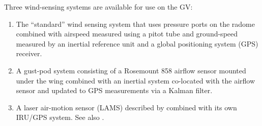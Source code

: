 \documentclass[12pt,twoside,english]{article}\usepackage[]{graphicx}\usepackage[]{color}
\let\OrgIndex\index
\renewcommand*{\index}[1]{\OrgIndex{#1}}
\begin{document}
Three wind-sensing systems are available for use on the GV:  
\begin{enumerate}
\item The ``standard'' wind sensing system that uses pressure ports on the radome combined with airspeed measured using a pitot tube and ground-speed measured by an inertial reference unit and a global positioning system (GPS) receiver.  
\item A gust-pod system consisting of a Rosemount 858 airflow sensor mounted under the wing combined with an inertial system co-located with the airflow sensor and updated to GPS measurements via a Kalman filter.  
\item A laser air-motion sensor (LAMS) described by \citet{SpulerEtAl2011}
combined with its own IRU/GPS system. See also \citet{CooperEtAl2014}.  
\end{enumerate}
\end{document}
